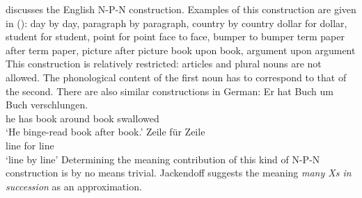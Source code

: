 \begin{exe}
\begin{xlist}[iv.]
\begin{exe}
\begin{xlist}[iv.]
\mbox{}\citet{Jackendoff2008a} discusses the English N-P-N construction. Examples of this construction are given in ():
\eal
\ex day by day, paragraph by paragraph, country by country
\ex dollar for dollar, student for student, point for point
\ex face to face, bumper to bumper
\ex term paper after term paper, picture after picture
\ex book upon book, argument upon argument
\zl
This construction is relatively restricted: articles and plural nouns are not allowed. The phonological content of the first noun has to correspond to that
of the second. There are also similar constructions in German:
\eal
\ex 
\gll Er hat Buch um Buch verschlungen.\\
	 he has book around book swallowed\\
\glt `He binge-read book after book.'
\ex 
\gll Zeile für Zeile\footnotemark\\
	 line for line\\
\glt `line by line'
\zl
Determining the meaning contribution of this kind of N-P-N construction is by no means trivial. Jackendoff suggests the meaning
\emph{many Xs in succession} as an approximation.


\end{xlist}
\end{exe}
\end{xlist}
\end{exe}
